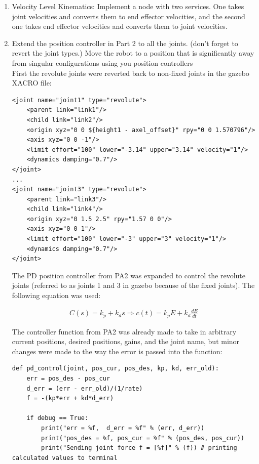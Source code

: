 \documentclass[10pt]{article}
\begin{document}
\begin{enumerate}
	\item Velocity Level Kinematics: Implement a node with two services. One takes joint velocities and converts them to end effector velocities, and the second one takes end effector velocities and converts them to joint velocities.
	
	\item Extend the position controller in Part 2 to all the joints. (don't forget to revert the joint types.) Move the robot to a position that is significantly away from singular configurations using you position controllers
	\\
	
	First the revolute joints were reverted back to non-fixed joints in the gazebo XACRO file:
	
\begin{lstlisting}[style=Matlab-editor,basicstyle=\mlttfamily,escapechar=`]
<joint name="joint1" type="revolute">
	<parent link="link1"/>
	<child link="link2"/>
	<origin xyz="0 0 ${height1 - axel_offset}" rpy="0 0 1.570796"/>
	<axis xyz="0 0 -1"/>
	<limit effort="100" lower="-3.14" upper="3.14" velocity="1"/>
	<dynamics damping="0.7"/>
</joint>
...
<joint name="joint3" type="revolute">
	<parent link="link3"/>
	<child link="link4"/>
	<origin xyz="0 1.5 2.5" rpy="1.57 0 0"/>
	<axis xyz="0 0 1"/>
	<limit effort="100" lower="-3" upper="3" velocity="1"/>
	<dynamics damping="0.7"/>
</joint>
\end{lstlisting} 
	
	The PD position controller from PA2 was expanded to control the revolute joints (referred to as joints 1 and 3 in gazebo because of the fixed joints). The following equation was used:
	
	\begin{align*}
		C(s) = k_p + k_d s \Rightarrow c(t) = k_p E + k_d \frac{dE}{dt}
	\end{align*}
	
	The controller function from PA2 was already made to take in arbitrary current positions, desired positions, gains, and the joint name, but minor changes were made to the way the error is passed into the function:
		
\begin{lstlisting}[style=Matlab-editor,basicstyle=\mlttfamily,escapechar=`]
def pd_control(joint, pos_cur, pos_des, kp, kd, err_old):
	err = pos_des - pos_cur
	d_err = (err - err_old)/(1/rate)
	f = -(kp*err + kd*d_err)
	
	if debug == True:
		print("err = %f,  d_err = %f" % (err, d_err))
		print("pos_des = %f, pos_cur = %f" % (pos_des, pos_cur))
		print("Sending joint force f = [%f]" % (f)) # printing calculated values to terminal
	

\end{lstlisting}
\end{enumerate}
\end{document}
